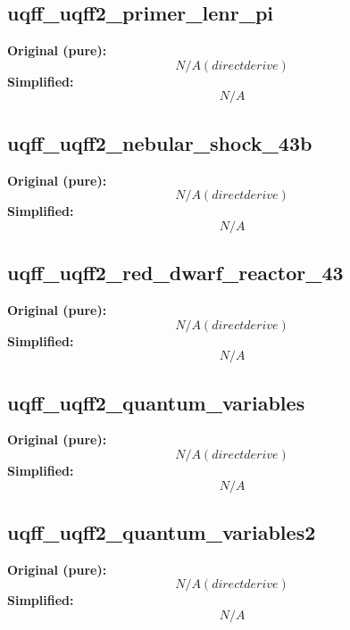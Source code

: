 \subsection{uqff_uqff2_primer_lenr_pi}
\textbf{Original (pure):}
\begin{equation}
N/A (direct derive)
\end{equation}
\textbf{Simplified:}
\begin{equation}
N/A
\end{equation}

\subsection{uqff_uqff2_nebular_shock_43b}
\textbf{Original (pure):}
\begin{equation}
N/A (direct derive)
\end{equation}
\textbf{Simplified:}
\begin{equation}
N/A
\end{equation}

\subsection{uqff_uqff2_red_dwarf_reactor_43}
\textbf{Original (pure):}
\begin{equation}
N/A (direct derive)
\end{equation}
\textbf{Simplified:}
\begin{equation}
N/A
\end{equation}

\subsection{uqff_uqff2_quantum_variables}
\textbf{Original (pure):}
\begin{equation}
N/A (direct derive)
\end{equation}
\textbf{Simplified:}
\begin{equation}
N/A
\end{equation}

\subsection{uqff_uqff2_quantum_variables2}
\textbf{Original (pure):}
\begin{equation}
N/A (direct derive)
\end{equation}
\textbf{Simplified:}
\begin{equation}
N/A
\end{equation}

